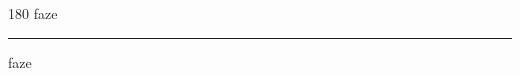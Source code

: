 
\begin{frame}
\begin{center}
\begin{turn}{180}
{\fontsize{2.5cm}{1em}\selectfont faze}
\end{turn}
\vspace{1em}\par  
\hrule
\vspace{1em}\par  
{\fontsize{2.5cm}{1em}\selectfont faze}
\end{center}
\end{frame}
